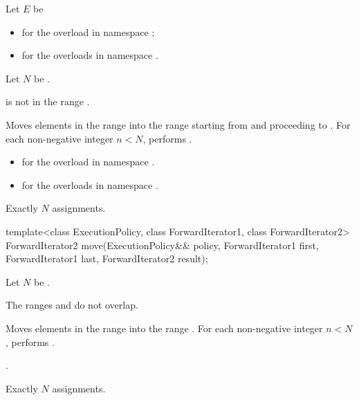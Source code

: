 \begin{itemdescr}
\pnum
Let $E$ be
\begin{itemize}
\item
  for the overload in namespace ;
\item
  for the overloads in namespace .
\end{itemize}
Let $N$ be .

\pnum
\expects
{} is not in the range .

\pnum
\effects
Moves elements in the range 
into the range 
starting from  and proceeding to .
For each non-negative integer $n < N$, performs .

\pnum
\returns
\begin{itemize}
\item
  for the overload in namespace .
\item
  for the overloads in namespace .
\end{itemize}

\pnum
\complexity
Exactly $N$ assignments.
\end{itemdescr}

%
\begin{itemdecl}
template<class ExecutionPolicy, class ForwardIterator1, class ForwardIterator2>
  ForwardIterator2 move(ExecutionPolicy&& policy,
                        ForwardIterator1 first, ForwardIterator1 last,
                        ForwardIterator2 result);
\end{itemdecl}

\begin{itemdescr}
\pnum
Let $N$ be .

\pnum
\expects
The ranges  and 
do not overlap.

\pnum
\effects
Moves elements in the range 
into the range .
For each non-negative integer $n < N$,
performs .

\pnum
\returns
{}.

\pnum
\complexity
Exactly $N$ assignments.
\end{itemdescr}

